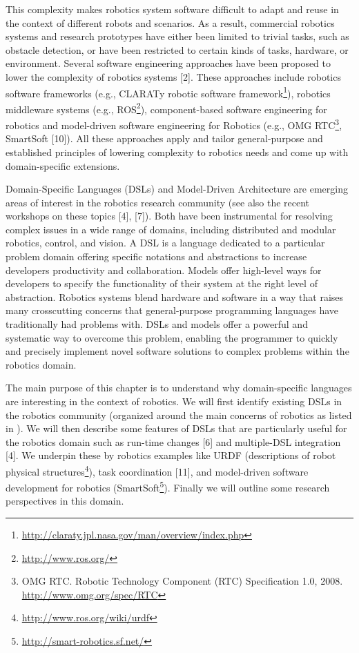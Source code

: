 \documentclass[jou]{apa}
\begin{document}
This complexity makes robotics system software difficult to adapt and reuse in the context of different robots and scenarios. As a result, commercial robotics systems and research prototypes have either been limited to trivial tasks, such as obstacle detection, or have been restricted to certain kinds of tasks, hardware, or environment. Several software engineering approaches have been proposed to lower the complexity of robotics systems [2]. These approaches include robotics software frameworks (e.g., CLARATy robotic software framework\footnote{\url{http://claraty.jpl.nasa.gov/man/overview/index.php}}), robotics middleware systems (e.g., ROS\footnote{\url{http://www.ros.org/}}), component-based software engineering for robotics\cite{Brugali:2007oq} and model-driven software engineering for Robotics (e.g., OMG RTC\footnote{OMG RTC. Robotic Technology Component (RTC) Specification 1.0, 2008. \url{http://www.omg.org/spec/RTC}}, SmartSoft [10]). All these approaches apply and tailor general-purpose and established principles of lowering complexity to robotics needs and come up with domain-specific extensions.

Domain-Specific Languages (DSLs)\cite{Deursen:2000uq} and Model-Driven Architecture are emerging areas of interest in the robotics research community (see also the recent workshops on these topics [4], [7]). Both have been instrumental for resolving complex issues in a wide range of domains, including distributed and modular robotics, control, and vision. A DSL is a language dedicated to a particular problem domain offering specific notations and abstractions to increase developers productivity and collaboration. Models offer high-level ways for developers to specify the functionality of their system at the right level of abstraction. Robotics systems blend hardware and software in a way that raises many crosscutting concerns that general-purpose programming languages have traditionally had problems with. DSLs and models offer a powerful and systematic way to overcome this problem, enabling the programmer to quickly and precisely implement novel software solutions to complex problems within the robotics domain.

The main purpose of this chapter is to understand why domain-specific languages are interesting in the context of robotics. We will first identify existing DSLs in the robotics community (organized around the main concerns of robotics as listed in \cite{SpringerHandbook:2008fk}). We will then describe some features of DSLs that are particularly useful for the robotics domain such as run-time changes [6] and multiple-DSL integration [4]. We underpin these by robotics examples like URDF (descriptions of robot physical structures\footnote{\url{http://www.ros.org/wiki/urdf}}), task coordination [11], and model-driven software development for robotics (SmartSoft\footnote{\url{http://smart-robotics.sf.net/}}). Finally we will outline some research perspectives in this domain.
\end{document}
